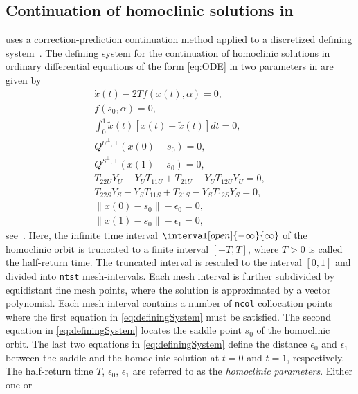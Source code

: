 \subsection{Continuation of homoclinic solutions in \MATCONT}
\fi
\label{sec:cont_hom_matcont}
\MATCONT uses a correction-prediction continuation method applied to a discretized defining
system~\cite{matcont2}. The defining system for the continuation of homoclinic
solutions in ordinary differential equations of the form \cref{eq:ODE} in two
parameters in \MATCONT are given by
\begin{equation}
\begin{aligned}
    \label{eq:definingSystem}
    \dot{x}(t)-2 T f(x(t), \alpha)=0,  \\
    f\left(s_{0}, \alpha\right)=0, \\
    \int_{0}^{1} \widetilde{x}(t)[x(t)-\widetilde{x}(t)] d t=0, \\
    Q^{U^{\perp}, \mathrm{T}}\left(x(0)-s_{0}\right)=0, \\
    Q^{S^{\perp}, \mathrm{T}}\left(x(1)-s_{0}\right)=0, \\
    T_{22 U} Y_{U}-Y_{U} T_{11 U}+T_{21 U}-Y_{U} T_{12 U} Y_{U}=0, \\
    T_{22 S} Y_{S}-Y_{S} T_{11 S}+T_{21 S}-Y_{S} T_{12 S} Y_{S}=0, \\
    \left\|x(0)-s_{0}\right\|-\epsilon_{0}=0, \\
    \left\|x(1)-s_{0}\right\|-\epsilon_{1}=0,
\end{aligned}
\end{equation}
see~\cite{DeWitte2012}.  Here, the infinite time interval
$\interval[open]{-\infty}{ \infty}$ of the homoclinic orbit is truncated to a
finite interval $[-T,T]$, where $T>0$ is called the half-return time. The
truncated interval is rescaled to the interval $[0,1]$ and divided into
\texttt{ntst} mesh-intervals. Each mesh interval is further
subdivided by equidistant fine mesh points, where the solution is approximated
by a vector polynomial. Each mesh interval contains a number of
\texttt{ncol} collocation points where the first equation in
\cref{eq:definingSystem} must be satisfied. The second equation in
\cref{eq:definingSystem} locates the saddle point $s_0$ of the homoclinic
orbit. The last two equations in \cref{eq:definingSystem} define the distance
$\epsilon_0$ and  $\epsilon_1$ between the saddle and the homoclinic solution
at $t=0$ and $t=1$, respectively. The half-return time $T$, $\epsilon_0$,
$\epsilon_1$ are referred to as the \emph{homoclinic parameters}. Either one or
